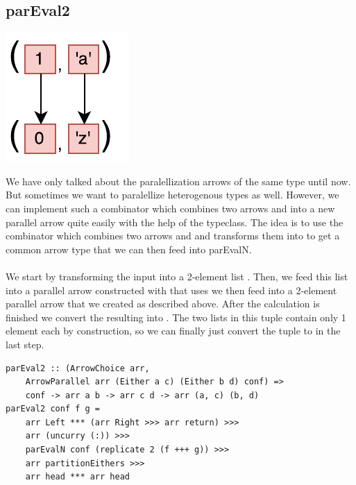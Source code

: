 \subsection{parEval2}
\begin{center}
	\includegraphics[scale=0.7]{images/parEval2}
\end{center}
We have only talked about the paralellization arrows of the same type until now. But sometimes we want to paralellize heterogenous types as well. However, we can implement such a  combinator which combines two arrows  and  into a new parallel arrow  quite easily with the help of the  typeclass. The idea is to use the \code{+++} combinator which combines two arrows  and  and transforms them into  to get a common arrow type that we can then feed into parEvalN.
\\\\
We start by transforming the  input into a 2-element list \code{[Either a c]}. Then, we feed this list into a parallel arrow constructed with  that uses   we then feed into a 2-element parallel arrow that we created as described above. After the calculation is finished we convert the resulting \code{[Either b d]} into \code{([b] , [d])}. The two lists in this tuple contain only 1 element each by construction, so we can finally just convert the tuple to  in the last step.
\begin{lstlisting}[frame=htrbl]
parEval2 :: (ArrowChoice arr,
	ArrowParallel arr (Either a c) (Either b d) conf) =>
	conf -> arr a b -> arr c d -> arr (a, c) (b, d)
parEval2 conf f g = 
	arr Left *** (arr Right >>> arr return) >>>
	arr (uncurry (:)) >>>
	parEvalN conf (replicate 2 (f +++ g)) >>>
	arr partitionEithers >>>
	arr head *** arr head
\end{lstlisting}